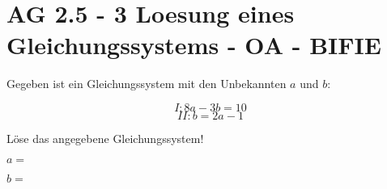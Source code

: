 \section{AG 2.5 - 3 Loesung eines Gleichungssystems - OA - BIFIE}

\begin{beispiel}[AG 2.5]{1} %
		Gegeben ist ein Gleichungssystem mit den Unbekannten $a$ und $b$:
		
	\[I : 8a-3b = 10  \]
	\[ II : b = 2a -1\]

Löse das angegebene Gleichungssystem!

\leer

$a=$ 
\leer

$b=$ 	
\end{beispiel}